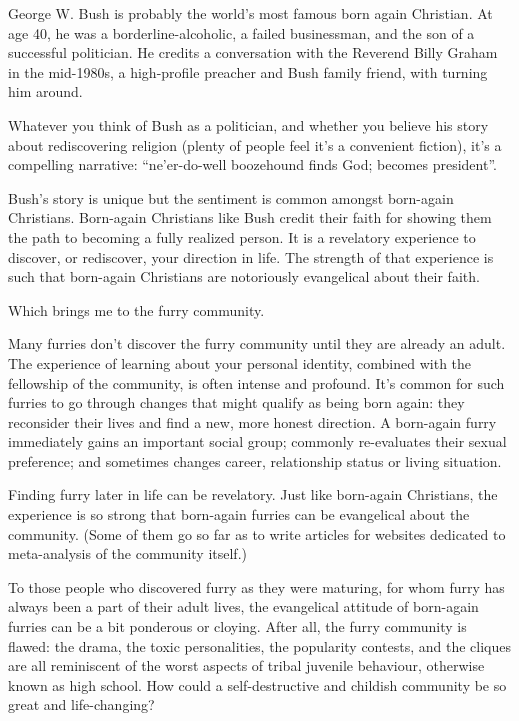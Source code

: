 
George W. Bush is probably the world's most famous born again Christian. At age 40, he was a borderline-alcoholic, a failed businessman, and the son of a successful politician. He credits a conversation with the Reverend Billy Graham in the mid-1980s, a high-profile preacher and Bush family friend, with turning him around.

Whatever you think of Bush as a politician, and whether you believe his story about rediscovering religion (plenty of people feel it's a convenient fiction), it's a compelling narrative: ``ne'er-do-well boozehound finds God; becomes president''.

Bush's story is unique but the sentiment is common amongst born-again Christians. Born-again Christians like Bush credit their faith for showing them the path to becoming a fully realized person. It is a revelatory experience to discover, or rediscover, your direction in life. The strength of that experience is such that born-again Christians are notoriously evangelical about their faith.

Which brings me to the furry community.

Many furries don't discover the furry community until they are already an adult. The experience of learning about your personal identity, combined with the fellowship of the community, is often intense and profound. It's common for such furries to go through changes that might qualify as being born again: they reconsider their lives and find a new, more honest direction. A born-again furry immediately gains an important social group; commonly re-evaluates their sexual preference; and sometimes changes career, relationship status or living situation.

Finding furry later in life can be revelatory. Just like born-again Christians, the experience is so strong that born-again furries can be evangelical about the community. (Some of them go so far as to write articles for websites dedicated to meta-analysis of the community itself.)

To those people who discovered furry as they were maturing, for whom furry has always been a part of their adult lives, the evangelical attitude of born-again furries can be a bit ponderous or cloying. After all, the furry community is flawed: the drama, the toxic personalities, the popularity contests, and the cliques are all reminiscent of the worst aspects of tribal juvenile behaviour, otherwise known as high school. How could a self-destructive and childish community be so great and life-changing?

